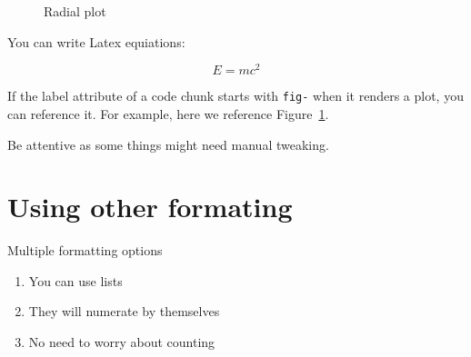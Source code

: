 \documentclass[
  number,
  preprint,
  3p,
  twocolumn]{elsarticle}
\providecommand{\tightlist}{%
  \setlength{\itemsep}{0pt}\setlength{\parskip}{0pt}}\usepackage{longtable,booktabs,array}
\begin{document}
\begin{figure}


\caption{\label{fig-radial}Radial plot}

\end{figure}%

You can write Latex equiations:

\[
E=mc^2
\]

If the label attribute of a code chunk starts with \texttt{fig-} when it
renders a plot, you can reference it. For example, here we reference
Figure~\ref{fig-radial}.

Be attentive as some things might need manual tweaking.

\section{Using other formating}\label{using-other-formating}

Multiple formatting options

\begin{enumerate}
\def\labelenumi{\arabic{enumi}.}
\tightlist
\item
  You can use lists
\item
  They will numerate by themselves
\item
  No need to worry about counting
\end{enumerate}
\end{document}
